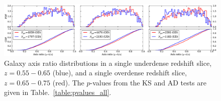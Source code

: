\documentclass[twocolumn,useAMS,usenatbib]{mn2e}
\begin{document}
\begin{figure}
 \centering
 \includegraphics[width=2.2\columnwidth]{axis_ratio_odud}
 \caption{Galaxy axis ratio distributions in a single underdense redshift
   slice, $z=0.55-0.65$ (blue), and a single overdense redshift slice,
   $z=0.65-0.75$ (red). The $p$-values from the
   KS and AD tests are given in Table.~\ref{table:pvalues_all}. }
 \label{fig:axisratio_contrasting}
\end{figure}
\end{document}
